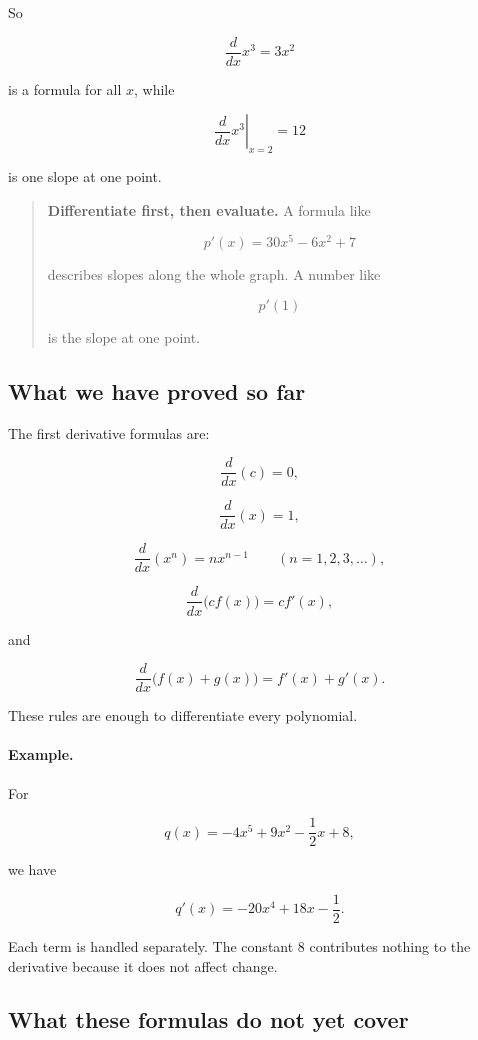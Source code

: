 So

\[
\frac{d}{dx}x^3=3x^2
\]

is a formula for all \(x\), while

\[
\left.\frac{d}{dx}x^3\right|_{x=2}=12
\]

is one slope at one point.

\begin{quote}
\textbf{Differentiate first, then evaluate.}
A formula like

\[
p'(x)=30x^5-6x^2+7
\]

describes slopes along the whole graph.  A number like

\[
p'(1)
\]

is the slope at one point.
\end{quote}

\subsection{What we have proved so far}
\label{subsec:first-derivative-formulas-summary}

The first derivative formulas are:

\[
\boxed{
\frac{d}{dx}(c)=0,
}
\]

\[
\boxed{
\frac{d}{dx}(x)=1,
}
\]

\[
\boxed{
\frac{d}{dx}(x^n)=nx^{n-1}
\qquad(n=1,2,3,\ldots),
}
\]

\[
\boxed{
\frac{d}{dx}\bigl(c f(x)\bigr)=c f'(x),
}
\]

and

\[
\boxed{
\frac{d}{dx}\bigl(f(x)+g(x)\bigr)=f'(x)+g'(x).
}
\]

These rules are enough to differentiate every polynomial.

\paragraph{Example.}
For

\[
q(x)=-4x^5+9x^2-\frac12x+8,
\]

we have

\[
q'(x)
=
-20x^4+18x-\frac12.
\]

Each term is handled separately.  The constant \(8\) contributes nothing to the derivative because it does not affect change.

\subsection{What these formulas do not yet cover}
\label{subsec:first-formulas-do-not-cover}

